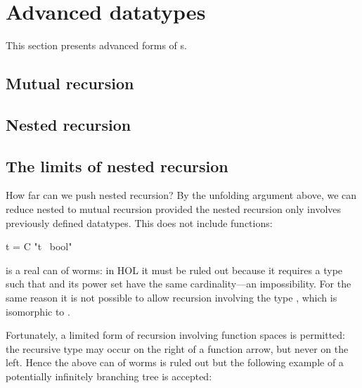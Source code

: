 


\section{Advanced datatypes}
\label{sec:advanced-datatypes}

This section presents advanced forms of s.

\subsection{Mutual recursion}
\label{sec:datatype-mut-rec}



\subsection{Nested recursion}
\label{sec:nested-datatype}

{\makeatother}


\subsection{The limits of nested recursion}

How far can we push nested recursion? By the unfolding argument above, we can
reduce nested to mutual recursion provided the nested recursion only involves
previously defined datatypes. This does not include functions:
\begin{isabelle}
 t = C "t \isasymRightarrow\ bool"
\end{isabelle}
is a real can of worms: in HOL it must be ruled out because it requires a type
 such that  and its power set  have the
same cardinality---an impossibility. For the same reason it is not possible
to allow recursion involving the type , which is isomorphic to
.

Fortunately, a limited form of recursion
involving function spaces is permitted: the recursive type may occur on the
right of a function arrow, but never on the left. Hence the above can of worms
is ruled out but the following example of a potentially infinitely branching tree is
accepted:
\smallskip


\bigskip

